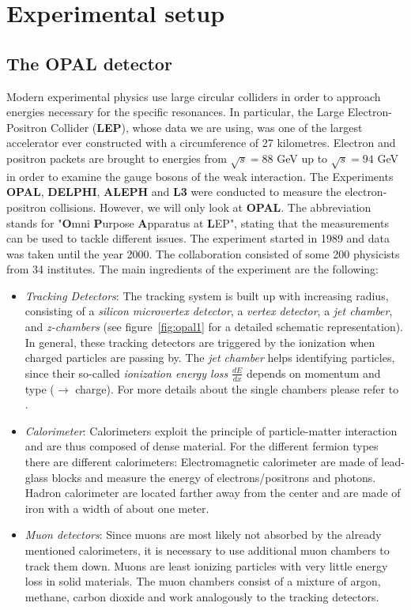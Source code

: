 \section{Experimental setup}
\subsection{The OPAL detector}
\label{sec:experimentalsetup}
Modern experimental physics use large circular colliders in order to approach energies necessary for the
specific resonances. In particular, the Large Electron-Positron Collider (\textbf{LEP}), whose data we are using, was one
of the largest accelerator ever constructed with a circumference of 27 kilometres. Electron and positron packets are brought
to energies from $\sqrt{s} = 88$ GeV up to $\sqrt{s} = 94$ GeV in order to examine the gauge bosons of the weak interaction. 
The Experiments \textbf{OPAL}, \textbf{DELPHI}, \textbf{ALEPH} and \textbf{L3} were conducted to measure the electron-positron
collisions. However, we will only look at \textbf{OPAL}. 
The abbreviation stands for  "\textbf{O}mni \textbf{P}urpose \textbf{A}pparatus at \textbf{L}EP", stating that the 
measurements can be used to tackle different issues. The experiment started in
1989 and data was taken until the year 2000. The collaboration consisted of some 200 physicists from 34 institutes.
The main ingredients of the experiment are the following: 
\begin{itemize}
    \item \emph{Tracking Detectors}: The tracking system is built up with increasing radius, consisting of 
        a \textit{silicon microvertex detector}, a \textit{vertex detector}, 
        a \textit{jet chamber}, and \textit{z-chambers} 
        (see figure~\ref{fig:opal1} for a detailed schematic representation). In general, these tracking detectors
    are triggered by the ionization when charged particles are passing by. 
    The \textit{jet chamber} helps identifying particles, since their so-called 
\textit{ionization energy loss} $\frac{dE}{dx}$ depends on momentum and type ($\rightarrow$ charge). For
    more details about the single chambers please refer to \cite{CERN_OPAL}.
\item \emph{Calorimeter}: Calorimeters exploit the principle of particle-matter interaction and are thus
    composed of dense material. For the different fermion types there are different calorimeters: Electromagnetic calorimeter
    are made of lead-glass blocks and measure the energy of electrons/positrons and photons. Hadron calorimeter are located
    farther away from the center and are made of iron with a width of about one meter. 
\item \emph{Muon detectors}: Since muons are most likely not absorbed by the already mentioned calorimeters, it is necessary 
        to use additional muon chambers to track them down. Muons are least ionizing particles with very little energy
        loss in solid materials. The muon chambers consist of a mixture of argon, methane, carbon dioxide and work analogously to
        the tracking detectors. 
\end{itemize}

